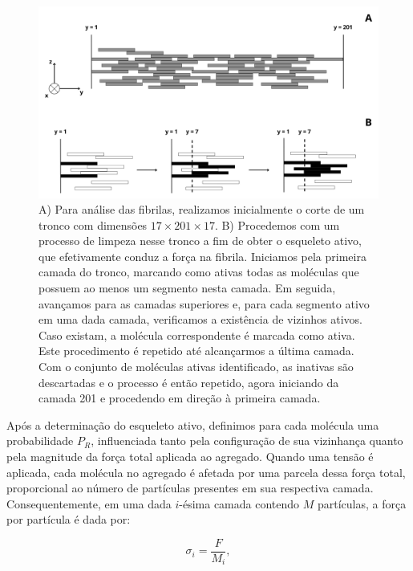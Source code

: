 \documentclass{article}
\begin{document}
        \begin{figure}[H]
            \centering
            \includegraphics[width=\textwidth]{figures/esqueleto.png}
    
            \caption{A) Para análise das fibrilas, realizamos inicialmente o corte de um tronco com dimensões \(17 \times 201 \times 17\). B) 
            Procedemos com um processo de limpeza nesse tronco a fim de obter o esqueleto ativo, que efetivamente conduz a força na fibrila. 
            Iniciamos pela primeira camada do tronco, marcando como ativas todas as moléculas que possuem ao menos um segmento nesta camada. Em 
            seguida, avançamos para as camadas superiores e, para cada segmento ativo em uma dada camada, verificamos a existência de vizinhos 
            ativos. Caso existam, a molécula correspondente é marcada como ativa. Este procedimento é repetido até alcançarmos a última camada. 
            Com o conjunto de moléculas ativas identificado, as inativas são descartadas e o processo é então repetido, agora iniciando da 
            camada 201 e procedendo em direção à primeira camada.}  
    
            \label{M3}
        \end{figure}

        Após a determinação do esqueleto ativo, definimos para cada molécula uma probabilidade \(P_{R}\), influenciada tanto pela configuração de
        sua vizinhança quanto pela magnitude da força total aplicada ao agregado. Quando uma tensão é aplicada, cada molécula no agregado é 
        afetada por uma parcela dessa força total, proporcional ao número de partículas presentes em sua respectiva camada. Consequentemente, em 
        uma dada \(i\)-ésima camada contendo \(M\) partículas, a força por partícula é dada por:  

        \begin{equation}
            \sigma_{i} = \frac{F}{M_{i}},
        \end{equation}
            
\end{document}
